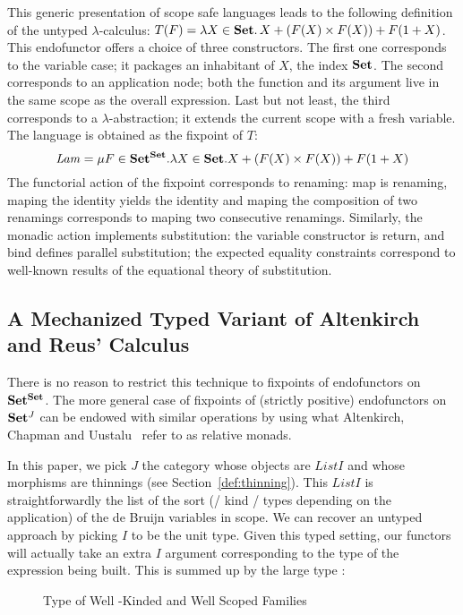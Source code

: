 This generic presentation of scope safe languages leads to the following
definition of the untyped $\lambda$-calculus:
$T(F) = \lambda X \in \mathbf{Set}{}.\, X + (F(X) \times F(X)) + F(1 + X)$.
This endofunctor offers a choice of three constructors.
The first one corresponds to the variable
case; it packages an inhabitant of $X$, the index $\mathbf{Set}{}$. The second corresponds
to an application node; both the function and its argument live in the same
scope as the overall expression. Last but not least, the third corresponds to
a $\lambda$-abstraction; it extends the current scope with a fresh variable.
The language is obtained as the fixpoint of $T$:
\[
   \mathit{Lam} = \mu F \in \mathbf{Set}{}^{\mathbf{Set}{}}.
   \lambda X \in \mathbf{Set}{}. X + (F(X) \times F(X)) + F(1 + X)
\]
The functorial action of the fixpoint corresponds to renaming: map is renaming,
maping the identity yields the identity and maping the composition of two
renamings corresponds to maping two consecutive renamings. Similarly, the monadic
action implements substitution: the variable constructor is return, and bind defines
parallel substitution; the expected equality constraints correspond to well-known
results of the equational theory of substitution.

\subsection{A Mechanized Typed Variant of Altenkirch and Reus' Calculus}

There is no reason to restrict this technique to fixpoints of endofunctors
on $\mathbf{Set}{}^{\mathbf{Set}{}}$. The more general
case of fixpoints of (strictly positive) endofunctors on $\mathbf{Set}{}^J$ can be
endowed with similar operations by using what Altenkirch, Chapman and
Uustalu~\citeyear{Altenkirch2010, JFR4389} refer to as relative monads.

In this paper, we pick $J$ the category whose objects are $\mathit{List} I$ and whose
morphisms are thinnings (see Section~\ref{def:thinning}). This $\mathit{List} I$ is straightforwardly the list
of the sort (/ kind / types depending on the application) of the de Bruijn variables
in scope. We can recover an untyped approach by picking $I$ to be the unit type.
Given this typed setting, our functors will actually take an extra $I$ argument
corresponding to the type of the expression being built. This is summed up by
the large type :

\begin{figure}[h]
\caption{Type of Well -Kinded and Well Scoped Families}
\end{figure}


